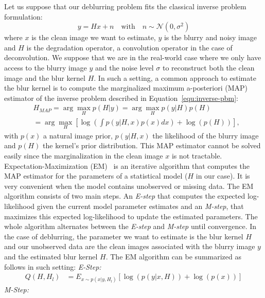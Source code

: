 \documentclass[10pt,twocolumn,letterpaper]{article}
\begin{document}
Let us suppose that our deblurring problem fits the classical inverse problem formulation:
\begin{equation}
\label{equ:inverse-pbm}
    y = Hx + n \quad \text{with} \quad n \sim \mathcal{N}(0, \sigma^2)
\end{equation}
where $x$ is the clean image we want to estimate, $y$ is the blurry and noisy image and $H$ is the degradation operator, a convolution operator in the case of deconvolution.
%
We suppose that we are in the real-world case where we only have access to the blurry image $y$ and the noise level $\sigma$ to reconstruct both the clean image and the blur kernel $H$. 
%
In such a setting, a common approach to estimate the blur kernel is to compute the marginalized maximum a-posteriori (MAP) estimator of the inverse problem described in Equation~\eqref{equ:inverse-pbm}:
%
\begin{align}
    \label{equ:likelihood}
    & H_{MAP} = \arg\max_H p(H|y) = \arg\max_H p(y|H)p(H) \\
    & = \arg\max_H \left[\log{\left(\int p(y|H,x)p(x)dx\right)} + \log(p(H)) \right], \nonumber
\end{align}
%
with $p(x)$ a natural image prior, $p(y|H,x)$ the likelihood of the blurry image and $p(H)$ the kernel's prior distribution.
%
This MAP estimator cannot be solved easily since the marginalization in the clean image $x$ is not tractable. Expectation-Maximization (EM)~\cite{Dempster1977, McLachlan2008} is an iterative algorithm that computes the MAP estimator for the parameters of a statistical model ($H$ in our case). It is very convenient when the model contains unobserved or missing data. The EM algorithm consists of two main steps. An \textit{E-step} that computes the expected log-likelihood given the current model parameter estimates and an \textit{M-step}, that maximizes this expected log-likelihood to update the estimated parameters. The whole algorithm alternates between the \textit{E-step} and \textit{M-step} until convergence. In the case of deblurring, the parameter we want to estimate is the blur kernel $H$ and our unobserved data are the clean images associated with the blurry image $y$ and the estimated blur kernel $H$. The EM algorithm can be summarized as follows in such setting:
\newline
\noindent\textit{E-Step:}
\begin{align}
\label{equ:e_step}
    Q(H,H_l) & = E_{x\sim p(x|y,H_l)}[\log(p(y|x,H)) + \log(p(x))]
\end{align}
\noindent\textit{M-Step:} 
\end{document}
